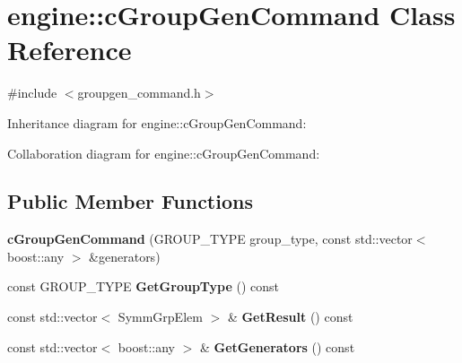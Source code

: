 \hypertarget{classengine_1_1cGroupGenCommand}{\section{engine\-:\-:c\-Group\-Gen\-Command Class Reference}
\label{classengine_1_1cGroupGenCommand}
}


{\ttfamily \#include $<$groupgen\-\_\-command.\-h$>$}



Inheritance diagram for engine\-:\-:c\-Group\-Gen\-Command\-:


Collaboration diagram for engine\-:\-:c\-Group\-Gen\-Command\-:
\subsection*{Public Member Functions}
\begin{DoxyCompactItemize}
\item 
\hypertarget{classengine_1_1cGroupGenCommand_a94d3c632e772f19a07dfb15a4d46a0d4}{{\bfseries c\-Group\-Gen\-Command} (G\-R\-O\-U\-P\-\_\-\-T\-Y\-P\-E group\-\_\-type, const std\-::vector$<$ boost\-::any $>$ \&generators)}\label{classengine_1_1cGroupGenCommand_a94d3c632e772f19a07dfb15a4d46a0d4}

\item 
\hypertarget{classengine_1_1cGroupGenCommand_a37b02fb65826fa2bccc6ca071eec3c64}{const G\-R\-O\-U\-P\-\_\-\-T\-Y\-P\-E {\bfseries Get\-Group\-Type} () const }\label{classengine_1_1cGroupGenCommand_a37b02fb65826fa2bccc6ca071eec3c64}

\item 
\hypertarget{classengine_1_1cGroupGenCommand_a508e5a05d72dcfc34c1bb9859b901a97}{const std\-::vector$<$ Symm\-Grp\-Elem $>$ \& {\bfseries Get\-Result} () const }\label{classengine_1_1cGroupGenCommand_a508e5a05d72dcfc34c1bb9859b901a97}

\item 
\hypertarget{classengine_1_1cGroupGenCommand_a423b76a5c2dbf49db40655f968f15758}{const std\-::vector$<$ boost\-::any $>$ \& {\bfseries Get\-Generators} () const }\label{classengine_1_1cGroupGenCommand_a423b76a5c2dbf49db40655f968f15758}

\end{DoxyCompactItemize}
